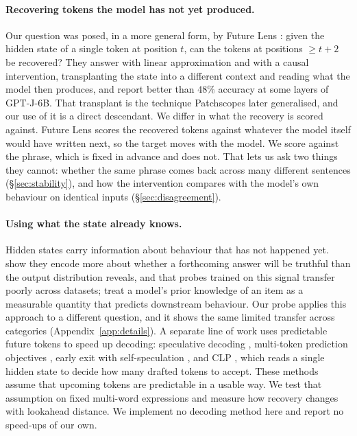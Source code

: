 \paragraph{Recovering tokens the model has not yet produced.}
Our question was posed, in a more general form, by Future Lens
\citep{pal-etal-2023-future}: given the hidden state of a single token at
position $t$, can the tokens at positions $\geq t+2$ be recovered? They answer
with linear approximation and with a causal intervention, transplanting the
state into a different context and reading what the model then produces, and
report better than $48\%$ accuracy at some layers of GPT-J-6B. That transplant
is the technique Patchscopes later generalised, and our use of it is a direct
descendant. We differ in what the recovery is scored against. Future Lens scores the recovered
tokens against whatever the model itself would have written next, so the target
moves with the model. We score against the phrase, which is fixed in advance and
does not. That lets us ask two things they cannot: whether the same phrase comes
back across many different sentences (\S\ref{sec:stability}), and how the
intervention compares with the model's own behaviour on identical inputs
(\S\ref{sec:disagreement}).

\paragraph{Using what the state already knows.}
Hidden states carry information about behaviour that has not happened yet.
\citet{orgad-etal-2025-llms} show they encode more about whether a forthcoming
answer will be truthful than the output distribution reveals, and that probes
trained on this signal transfer poorly across datasets;
\citet{gekhman-etal-2024-fine} treat a model's prior knowledge of an item as a
measurable quantity that predicts downstream behaviour. Our probe applies this
approach to a different question, and it shows the same limited transfer across
categories (Appendix~\ref{app:details}). A separate line
of work uses predictable future tokens to speed up decoding: speculative decoding
\citep{leviathan-etal-2023-fast}, multi-token prediction objectives
\citep{gloeckle-etal-2024-better,aynetdinov-akbik-2025-babies}, early exit with
self-speculation \citep{elhoushi-etal-2024-layerskip}, and CLP
\citep{xie-zhou-2026-clp}, which reads a single hidden state to decide how many
drafted tokens to accept. These methods assume that upcoming tokens are
predictable in a usable way. We test that assumption on fixed multi-word
expressions and measure how recovery changes with lookahead distance. We
implement no decoding method here and report no speed-ups of our own.
